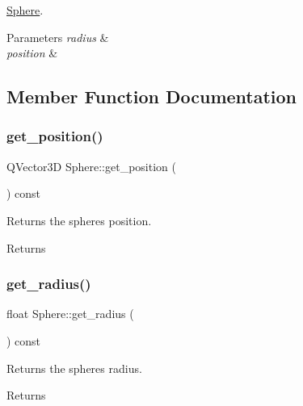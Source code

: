 \mbox{\hyperlink{class_sphere}{Sphere}}. 


\begin{DoxyParams}{Parameters}
{\em radius} & \\
\hline
{\em position} & \\
\hline
\end{DoxyParams}


\subsection{Member Function Documentation}
\mbox{\label{class_sphere_a253bd3ccf57e854989fb49c835fddb0b}} 
\subsubsection{\texorpdfstring{get\+\_\+position()}{get\_position()}}
{\footnotesize\ttfamily Q\+Vector3D Sphere\+::get\+\_\+position (\begin{DoxyParamCaption}{ }\end{DoxyParamCaption}) const}



Returns the spheres position. 

\begin{DoxyReturn}{Returns}

\end{DoxyReturn}
\mbox{\label{class_sphere_ac22727cc5f7fdac7548798fb88f7cadd}} 
\subsubsection{\texorpdfstring{get\+\_\+radius()}{get\_radius()}}
{\footnotesize\ttfamily float Sphere\+::get\+\_\+radius (\begin{DoxyParamCaption}{ }\end{DoxyParamCaption}) const}



Returns the spheres radius. 

\begin{DoxyReturn}{Returns}

\end{DoxyReturn}
\mbox{\label{class_sphere_a789d83c264bed2ee64a30bca1261ab41}} 
